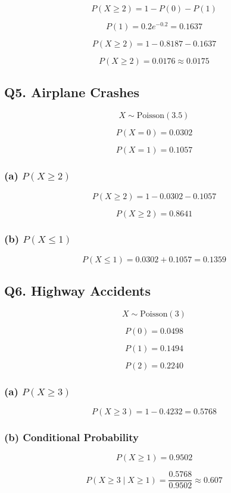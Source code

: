 \documentclass[12pt]{article}
\begin{document}
\[
P(X \ge 2) = 1 - P(0) - P(1)
\]

\[
P(1) = 0.2e^{-0.2} = 0.1637
\]

\[
P(X \ge 2) = 1 - 0.8187 - 0.1637
\]

\[
P(X \ge 2) = 0.0176 \approx 0.0175
\]

\subsection*{Q5. Airplane Crashes}

\[
X \sim \text{Poisson}(3.5)
\]

\[
P(X=0) = 0.0302
\]

\[
P(X=1) = 0.1057
\]

\subsubsection*{(a) $P(X \ge 2)$}

\[
P(X \ge 2) = 1 - 0.0302 - 0.1057
\]

\[
P(X \ge 2) = 0.8641
\]

\subsubsection*{(b) $P(X \le 1)$}

\[
P(X \le 1) = 0.0302 + 0.1057 = 0.1359
\]

\subsection*{Q6. Highway Accidents}

\[
X \sim \text{Poisson}(3)
\]

\[
P(0) = 0.0498
\]

\[
P(1) = 0.1494
\]

\[
P(2) = 0.2240
\]

\subsubsection*{(a) $P(X \ge 3)$}

\[
P(X \ge 3) = 1 - 0.4232 = 0.5768
\]

\subsubsection*{(b) Conditional Probability}

\[
P(X \ge 1) = 0.9502
\]

\[
P(X \ge 3 \mid X \ge 1)
=
\frac{0.5768}{0.9502}
\approx 0.607
\]
\end{document}
